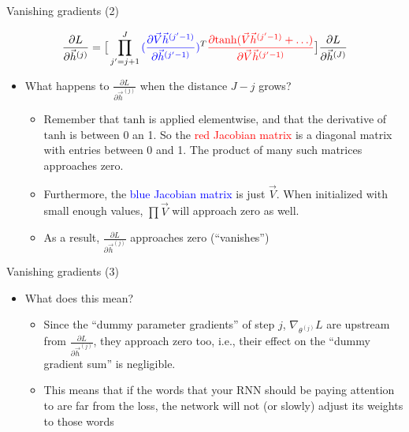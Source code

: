 \begin{vbframe}{Vanishing gradients (2)}

\vfill

$$
\frac{\partial L}{\partial \vec h^{(j)}} = \big[\prod_{j'=j+1}^{J} \textcolor{blue}{(\frac{\partial \vec V \vec h^{(j'-1)}}{\partial \vec h^{(j'-1)}})}^T \textcolor{red}{ \frac{\partial \mathrm{tanh}(\vec V \vec h^{(j'-1)} + \ldots)}{\partial \vec V \vec h^{(j'-1)}}} \big] \frac{\partial L}{\partial \vec h^{(J)}}
$$
\begin{itemize}
	\item What happens to $\frac{\partial L}{\partial \vec h^{(j)}}$ when the distance $J-j$ grows?
		\begin{itemize}
			\item Remember that $\mathrm{tanh}$ is applied elementwise, and that the derivative of $\mathrm{tanh}$ is between 0 an 1. So the \textcolor{red}{red Jacobian matrix} is a diagonal matrix with entries between 0 and 1.
			The product of many such matrices approaches zero.
			\item Furthermore, the \textcolor{blue}{blue Jacobian matrix} is just $\vec V$. When initialized with small enough values, $\prod \vec V$ will approach zero as well.
			\item As a result, $\frac{\partial L}{\partial \vec h^{(j)}}$ approaches zero (``vanishes'')
		\end{itemize}
\end{itemize}

\vfill

\end{vbframe}


\begin{vbframe}{Vanishing gradients (3)}

\vfill

\begin{itemize}
\item What does this mean?
	\begin{itemize}
		\item Since the ``dummy parameter gradients'' of step $j$, $\nabla_{\theta^{(j)}} L$ are upstream from $\frac{\partial L}{\partial \vec h^{(j)}}$, they approach zero too, i.e., their effect on the ``dummy gradient sum'' is negligible.
		\item This  means that if the words that your RNN should be paying attention to are far from the loss, the network will not (or slowly) adjust its weights to those words
	\end{itemize}
\end{itemize}

\vfill

\end{vbframe}

